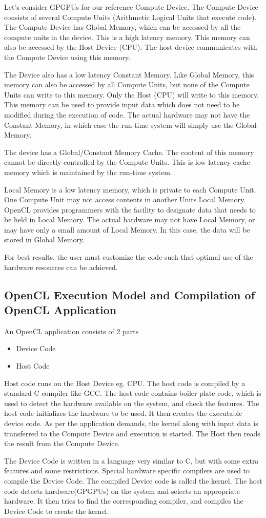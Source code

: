 \documentclass[]{scrartcl}
\begin{document}
Let's consider GPGPUs for our reference Compute Device. The Compute Device consists of
several Compute Units (Arithmetic Logical Units that execute code). The Compute Device has
Global Memory, which can be accessed by all the compute units in the device. This is a high
latency memory. This memory can also be accessed by the Host Device (CPU). The host device
communicates with the Compute Device using this memory.

The Device also has a low latency Constant Memory. Like Global Memory, this memory can also
be accessed by all Compute Units, but none of the Compute Units can write to this memory. 
Only the Host (CPU) will write to this memory. This memory can be used to provide input data
which does not need to be modified during the execution of code. The actual hardware may not
have the Constant Memory, in which case the run-time system will simply use the Global Memory.

The device has a Global/Constant Memory Cache. The content of this memory cannot be directly
controlled by the Compute Units. This is low latency cache memory which is maintained by the
run-time system.

Local Memory is a low latency memory, which is private to each Compute Unit. One Compute Unit
may not access contents in another Units Local Memory. OpenCL provides programmers with the
facility to designate data that needs to be held in Local Memory. The actual hardware may not
have Local Memory, or may have only a small amount of Local Memory. In this case, the data will
be stored in Global Memory. 

For best results, the user must customize the code such that optimal use of the hardware
resources can be achieved.

\pagebreak
\subsection{OpenCL Execution Model and Compilation of OpenCL Application}
An OpenCL application consists of 2 parts
\begin{itemize}
	\item Device Code
	\item Host Code
\end{itemize}
Host code runs on the Host Device eg. CPU. The host code is compiled by a standard C
compiler like GCC. The host code contains boiler plate code, which is used to detect the
hardware available on the system, and check the features. The host code initializes the
hardware to be used. It then creates the executable device code. As per the application
demands, the kernel along with input data is transferred to the Compute Device and execution
is started. The Host then reads the result from the Compute Device.

The Device Code is written in a language very similar to C, but with some extra features
and some restrictions. Special hardware specific compilers are used to compile the Device Code.
The compiled Device code is called the kernel. The host code detects hardware(GPGPUs) on the 
system and selects an appropriate hardware. It then tries to find the corresponding compiler,
and compiles the Device Code to create the kernel.
\end{document}
